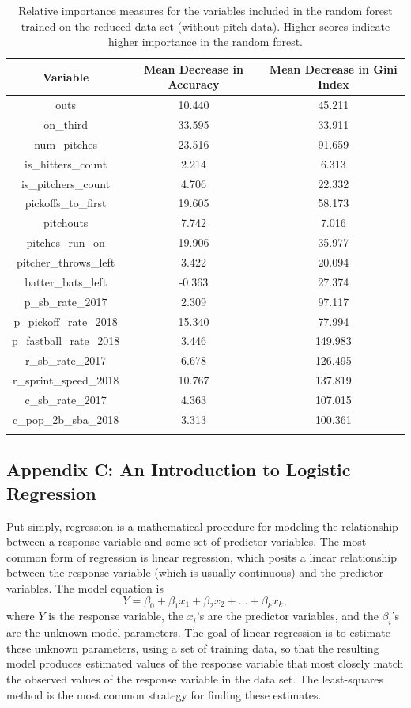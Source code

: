 \documentclass{article}
\begin{document}
\begin{longtable}{c c c}
    \hline
    Variable & Mean Decrease in Accuracy & Mean Decrease in Gini Index \\
    \hline
    outs & 10.440 & 45.211 \\
    on\_third & 33.595 & 33.911 \\
    num\_pitches & 23.516 & 91.659 \\
    is\_hitters\_count & 2.214 & 6.313 \\
    is\_pitchers\_count & 4.706 & 22.332 \\
    pickoffs\_to\_first & 19.605 & 58.173 \\
    pitchouts & 7.742 & 7.016 \\
    pitches\_run\_on & 19.906 & 35.977 \\
    pitcher\_throws\_left & 3.422 & 20.094 \\
    batter\_bats\_left & -0.363 & 27.374 \\
    p\_sb\_rate\_2017 & 2.309 & 97.117 \\
    p\_pickoff\_rate\_2018 & 15.340 & 77.994 \\
    p\_fastball\_rate\_2018 & 3.446 & 149.983 \\
    r\_sb\_rate\_2017 & 6.678 & 126.495 \\
    r\_sprint\_speed\_2018 & 10.767 & 137.819 \\
    c\_sb\_rate\_2017 & 4.363 & 107.015 \\
    c\_pop\_2b\_sba\_2018 & 3.313 & 100.361 \\
    \hline
    \caption{Relative importance measures for the variables included in the random forest trained on the reduced data set (without pitch data). Higher scores indicate higher importance in the random forest.}
    \label{tab6_importance}
\end{longtable}


\subsection*{Appendix C: An Introduction to Logistic Regression}

Put simply, regression is a mathematical procedure for modeling the relationship between a response variable and some set of predictor variables. The most common form of regression is linear regression, which posits a linear relationship between the response variable (which is usually continuous) and the predictor variables. The model equation is \[Y = \beta_0 + \beta_1x_1 + \beta_2x_2 + \dots + \beta_kx_k,\] where $Y$ is the response variable, the $x_i$'s are the predictor variables, and the $\beta_i$'s are the unknown model parameters. The goal of linear regression is to estimate these unknown parameters, using a set of training data, so that the resulting model produces estimated values of the response variable that most closely match the observed values of the response variable in the data set. The least-squares method is the most common strategy for finding these estimates.
\end{document}
